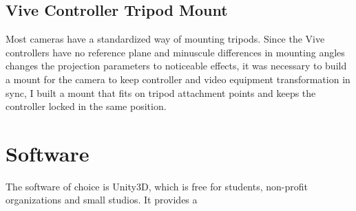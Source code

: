 \subsection{Vive Controller Tripod Mount}
Most cameras have a standardized way of mounting tripods. Since the Vive 
controllers have no reference plane and minuscule differences in mounting 
angles changes the projection parameters to noticeable effects, it was 
necessary to build a mount for the camera to keep controller and video 
equipment transformation in sync, I built a mount that fits on tripod 
attachment points and keeps the controller locked in the same position.

\section{Software}

The software of choice is Unity3D, which is free for students, non-profit 
organizations and small studios. It provides a 